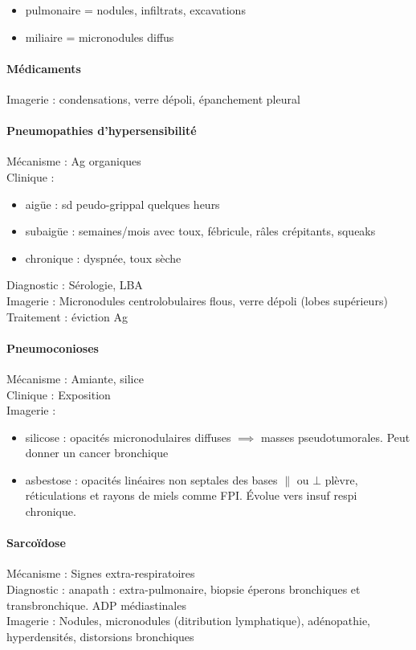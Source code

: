 \documentclass[11pt]{article}
\begin{document}
\begin{itemize}
\item pulmonaire = nodules, infiltrats, excavations
\item miliaire = micronodules diffus
\end{itemize}


\paragraph{Médicaments}
\label{sec:org2219fe4}
Imagerie : condensations, verre dépoli, épanchement pleural

\paragraph{Pneumopathies d'hypersensibilité}
\label{sec:orge1b1184}
Mécanisme : Ag organiques\\
Clinique : 

\begin{itemize}
\item aigüe : sd peudo-grippal quelques heurs
\item subaigüe : semaines/mois avec toux, fébricule, râles crépitants, squeaks
\item chronique : dyspnée, toux sèche
\end{itemize}

Diagnostic : Sérologie, LBA\\
Imagerie : Micronodules centrolobulaires flous, verre dépoli (lobes supérieurs)\\
Traitement : éviction Ag

\paragraph{Pneumoconioses}
\label{sec:orge4eb82e}
Mécanisme : Amiante, silice\\
Clinique : Exposition\\
Imagerie : 

\begin{itemize}
\item silicose : opacités micronodulaires diffuses \(\implies\) masses pseudotumorales. Peut donner un cancer bronchique
\item asbestose : opacités linéaires non septales des bases \(\parallel\) ou \(\bot\) plèvre, réticulations et rayons de miels comme FPI. Évolue vers insuf respi chronique.
\end{itemize}


\paragraph{Sarcoïdose}
\label{sec:org20e623a}
Mécanisme : Signes extra-respiratoires\\
Diagnostic : anapath : extra-pulmonaire, biopsie éperons bronchiques et transbronchique. ADP médiastinales \\
Imagerie : Nodules, micronodules (ditribution lymphatique), adénopathie, hyperdensités, distorsions bronchiques
\end{document}
